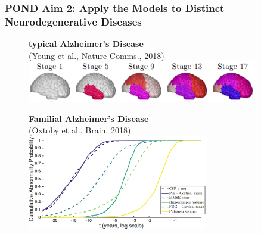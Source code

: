 \documentclass[8pt,xcolor=table,aspectratio=169]{beamer}
\begin{document}
\begin{frame}
\frametitle{POND Aim 2: Apply the Models to Distinct Neurodegenerative Diseases}

\newcommand{\mnpHeight}{3cm}

\vspace{-3em}
  
  
  \hspace{-2em}
  \begin{small}
  \begin{figure}[h]
  \centering
  
      \begin{minipage}[t][\mnpHeight][t]{0.4\linewidth}
    \centering
    \textbf{typical Alzheimer's Disease}\\ \footnotesize{(Young et al., Nature Comms., 2018)}
    \includegraphics[width=0.9\textwidth]{young_progression.png}
  \end{minipage}
  \begin{minipage}[t][\mnpHeight][t]{0.4\linewidth}
    \centering
    \textbf{Familial Alzheimer's Disease}\\ \footnotesize{(Oxtoby et al., Brain, 2018)}
    \includegraphics[width=0.7\textwidth,trim=0 0 0 0, clip]{neil_dian.png}
    
    \vspace{2em}
    
  \end{minipage}
  \vspace{2em}
  

\end{figure}
\end{small}
\end{frame}
\end{document}
